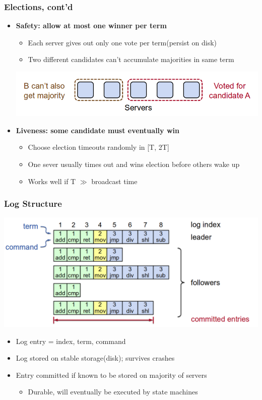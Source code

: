 \begin{frame}
    \frametitle{Elections, cont'd}
    \begin{itemize}
        \item \textbf{\alert{Safety}: allow at most one winner per term}
            \begin{itemize}
                \item Each server gives out only one vote per term(persist on disk)
                \item Two different candidates can't accumulate majorities in same term
            \end{itemize}
        \includegraphics[scale=0.3]{./figures/raft-safety.png}
        \item \textbf{\alert{Liveness}: some candidate must eventually win}
            \begin{itemize}
                \item Choose election timeouts randomly in [T, 2T]
                \item One sever usually times out and wins election before others wake up
                \item Works well if T $\gg$ broadcast time
            \end{itemize}
    \end{itemize}
\end{frame}

\begin{frame}
    \frametitle{Log Structure}
    \includegraphics[scale=0.3]{./figures/raft-log.png}
    \begin{itemize}
        \item Log entry = index, term, command
        \item Log stored on stable storage(disk); survives crashes
        \item Entry \alert{committed} if known to be stored on majority of servers
            \begin{itemize}
                \item Durable, will eventually be executed by state machines
            \end{itemize}
    \end{itemize}
\end{frame}

